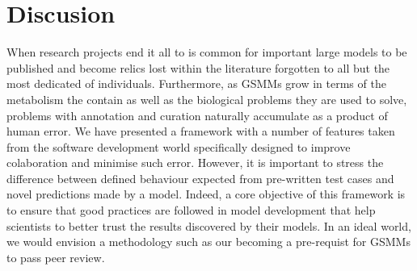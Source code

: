 \documentclass{bioinfo}
\begin{document}
% 
% 
% 
% 
% 
% 
\section{Discusion}
When research projects end it all to is common for important large models to be published and become relics lost within the literature forgotten to all but the most dedicated of individuals.
Furthermore, as GSMMs grow in terms of the metabolism the contain as well as the biological problems they are used to solve, problems with annotation and curation naturally accumulate as a product of human error.
We have presented a framework with a number of features taken from the software development world specifically designed to improve colaboration and minimise such error.
However, it is important to stress the difference between defined behaviour expected from pre-written test cases and novel predictions made by a model.
Indeed, a core objective of this framework is to ensure that good practices are followed in model development that help scientists to better trust the results discovered by their models.
In an ideal world, we would envision a methodology such as our becoming a pre-requist for GSMMs to pass peer review. 
\end{document}
